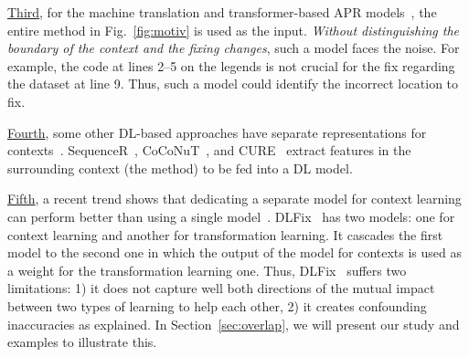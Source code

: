 

\underline{Third}, for the machine translation and transformer-based
APR
models~\cite{hata2018learning,tufano2019learning,tufano2018empirical},
the entire method in Fig.~\ref{fig:motiv} is used as the input. {\em
  Without distinguishing the boundary of the context and the fixing
  changes}, such a model faces the noise.
For example, the code at lines 2--5 on the legends is not crucial for
the fix regarding the dataset at line 9. Thus, such a model could
identify the incorrect location to fix.

\underline{Fourth}, some other DL-based approaches have separate
representations for
contexts~\cite{chen2018sequencer,cure-icse21,lutellier2020coconut}.
SequenceR~\cite{chen2018sequencer},
CoCoNuT~\cite{lutellier2020coconut}, and CURE~\cite{cure-icse21}
extract features in the surrounding context (the method)
to be fed into a DL model.



\underline{Fifth}, a recent trend shows that dedicating a separate
model for context learning can perform better than using a single
model~\cite{icse20}. DLFix~\cite{icse20} has two models: one for
context learning and another for transformation learning.
It cascades the first model to the second one in which the output
of the model for contexts is used as a weight for the transformation
learning one. Thus, DLFix~\cite{icse20} suffers two limitations: 1)
it does not capture well both directions of the mutual impact between
two types of learning to help each other,
2) it creates confounding inaccuracies as explained.
%
In Section~\ref{sec:overlap}, we will present our study and examples
to illustrate this.

